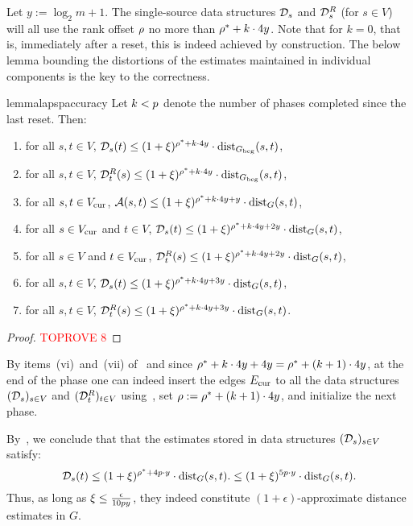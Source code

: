 \documentclass[11pt,letterpaper]{article}
\theoremstyle{plain}
\newcommand{\eps}{\ensuremath{\epsilon}}
\newcommand{\dist}{\mathrm{dist}}
\begin{document}
Let $y:=\log_2{m}+1$.
The single-source data structures $\mathcal{D}_s$ and $\mathcal{D}^{R}_s$ (for $s\in V$) will all use the rank
offset $\rho$ no more than $\rho^*+k\cdot 4y$.
Note that for $k=0$, that is, immediately after a reset, this is indeed achieved by construction.
The below lemma bounding the distortions of the estimates maintained in individual components
is the key to the correctness.

\begin{restatable}{lemma}{lapspaccuracy}\label{l:apsp-accuracy}
Let $k< p$ denote the number of phases completed since the last reset. Then:
  \begin{enumerate}[label=(\roman*)]
\item for all $s,t\in V$, $\dsfrom_s(t)\leq (1+\epsp)^{\roff^*+k\cdot 4y}\cdot \dist_{\Gbeg}(s,t)$,
\item for all $s,t\in V$, $\dsto_t(s)\leq (1+\epsp)^{\roff^*+k\cdot 4y}\cdot \dist_{\Gbeg}(s,t)$,
\item for all $s,t\in V_{\mathrm{cur}}$, $\apsp(s,t)\leq (1+\epsp)^{\roff^*+k\cdot 4y+y}\cdot \dist_{G}(s,t)$,
\item for all $s\in V_{\mathrm{cur}}$ and $t\in V$, $\dsfrom_s(t)\leq (1+\epsp)^{\roff^*+k\cdot 4y+2y}\cdot \dist_G(s,t)$,
\item for all $s\in V$ and $t\in V_{\mathrm{cur}}$, $\dsto_t(s)\leq (1+\epsp)^{\roff^*+k\cdot 4y+2y}\cdot \dist_G(s,t)$,
\item for all $s,t\in V$, $\dsfrom_s(t)\leq (1+\epsp)^{\roff^*+k\cdot 4y+3y}\cdot \dist_G(s,t)$,
\item for all $s,t\in V$, $\dsto_t(s)\leq (1+\epsp)^{\roff^*+k\cdot 4y+3y}\cdot \dist_G(s,t)$.
\end{enumerate}
\end{restatable}
\begin{proof}\textcolor{red}{TOPROVE 8}\end{proof}


By items~(vi)~and~(vii) of~ and since $\rho^*+k\cdot 4y+4y=\rho^*+(k+1)\cdot 4y$, at the end of the phase one can indeed
insert the edges $E_{\mathrm{cur}}$ to all the data structures $(\mathcal{D}_s)_{s\in V}$ and $(\mathcal{D}^{R}_t)_{t\in V}$
using~, set $\rho:=\rho^*+(k+1)\cdot 4y$, and initialize the next phase.

By~, we conclude that that the estimates stored in data structures $(\mathcal{D}_s)_{s\in V}$
satisfy:
\[ \dsfrom_s(t)\leq (1+\epsp)^{\roff^*+4\reset\cdot y}\cdot \dist_G(s,t). \leq (1+\epsp)^{5\reset\cdot y}\cdot \dist_G(s,t).\]
Thus, as long as $\epsp\leq \frac{\eps}{10\reset y}$, they indeed constitute $(1+\eps)$-approximate distance estimates in $G$.
\end{document}

